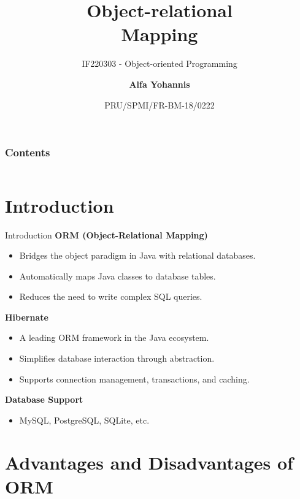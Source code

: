 \documentclass[aspectratio=169, table]{beamer}
\subtitle{IF220303 - Object-oriented Programming}
\title{\Huge Object-relational\\Mapping}
\date[Serial]{\scriptsize {PRU/SPMI/FR-BM-18/0222}}
\author[Pradita]{\small {\textbf{Alfa Yohannis}}}
\begin{document}
	
	\frame{\titlepage}
	
\begin{frame}[fragile]
	\frametitle{Contents}
	\vspace{20pt}
	\begin{columns}[t]
		\tableofcontents[sections={1-3}]
		
		\tableofcontents[sections={4-90}]
	\end{columns}
\end{frame}

\section{Introduction}
\begin{frame}{Introduction}
	\vspace{20pt}
	\textbf{ORM (Object-Relational Mapping)}
	\begin{itemize}
		\item Bridges the object paradigm in Java with relational databases.
		\item Automatically maps Java classes to database tables.
		\item Reduces the need to write complex SQL queries.
	\end{itemize}
	
	\textbf{Hibernate}
	\begin{itemize}
		\item A leading ORM framework in the Java ecosystem.
		\item Simplifies database interaction through abstraction.
		\item Supports connection management, transactions, and caching.
	\end{itemize}
	
	\textbf{Database Support}
	\begin{itemize}
		\item MySQL, PostgreSQL, SQLite, etc.
	\end{itemize}
\end{frame}

\section{Advantages and Disadvantages of ORM}
\end{document}

